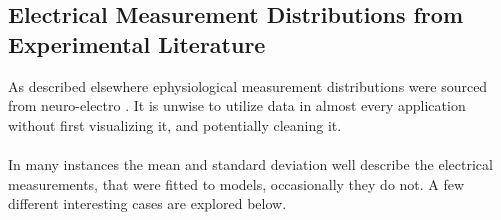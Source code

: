 \subsection{Electrical Measurement Distributions from Experimental Literature}%
As described elsewhere ephysiological measurement distributions were sourced from neuro-electro \cite{tripathy2014neuroelectro}. It is unwise to utilize data in almost every application without first visualizing it, and potentially cleaning it.\\
\\
In many instances the mean and standard deviation well describe the electrical measurements, that were fitted to models, occasionally they do not. A few different interesting cases are explored below.

